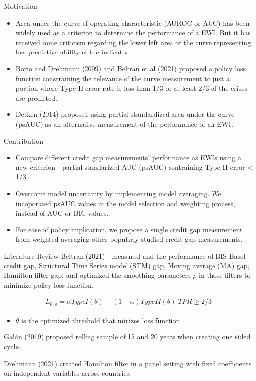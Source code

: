 \documentclass[
  ignorenonframetext,
]{beamer}
\providecommand{\tightlist}{%
  \setlength{\itemsep}{0pt}\setlength{\parskip}{0pt}}
\begin{document}
\begin{frame}{Motivation}
\protect\hypertarget{motivation-1}{}
\begin{itemize}
\tightlist
\item
  Area under the curve of operating characteristic (AUROC or AUC) has
  been widely used as a criterion to determine the performance of a EWI.
  But it has received some criticism regarding the lower left area of
  the curve representing low predictive ability of the indicator.
\item
  Borio and Drehmann (2009) and Beltran et al (2021) proposed a policy
  loss function constraining the relevance of the curve measurement to
  just a portion where Type II error rate is less than 1/3 or at least
  2/3 of the crises are predicted.\\
\item
  Detken (2014) proposed using partial standardized area under the curve
  (psAUC) as an alternative measurement of the performance of an EWI.
\end{itemize}
\end{frame}

\begin{frame}{Contribution}
\protect\hypertarget{contribution}{}
\begin{itemize}
\tightlist
\item
  Compare different credit gap measurements' performance as EWIs using a
  new criterion - partial standarized AUC (psAUC) contraining Type II
  error \textless{} 1/3.
\item
  Overcome model uncertainty by implementing model averaging. We
  incoporated psAUC values in the model selection and weighting process,
  instead of AUC or BIC values.
\item
  For ease of policy implication, we propose a single credit gap
  measurement from weighted averaging other popularly studied credit gap
  measurements.
\end{itemize}
\end{frame}

\begin{frame}{Literature Review}
\protect\hypertarget{literature-review}{}
Beltran (2021) - measured and the performance of BIS Basel credit gap,
Structural Time Series model (STM) gap, Moving average (MA) gap,
Hamilton filter gap, and optimized the smoothing parameters \(\rho\) in
those filters to minimize policy loss function.

\begin{align*}
L_{\theta,\rho}=\alpha TypeI(\theta)+(1-\alpha)TypeII(\theta)|TPR\ge2/3
\end{align*}

\begin{itemize}
\tightlist
\item
  \(\theta\) is the optimized threshold that minizes loss function.
\end{itemize}

Galán (2019) proposed rolling sample of 15 and 20 years when creating
one sided cycle.

Drehmann (2021) created Hamilton filter in a panel setting with fixed
coefficients on independent variables across countries.
\end{frame}
\end{document}

